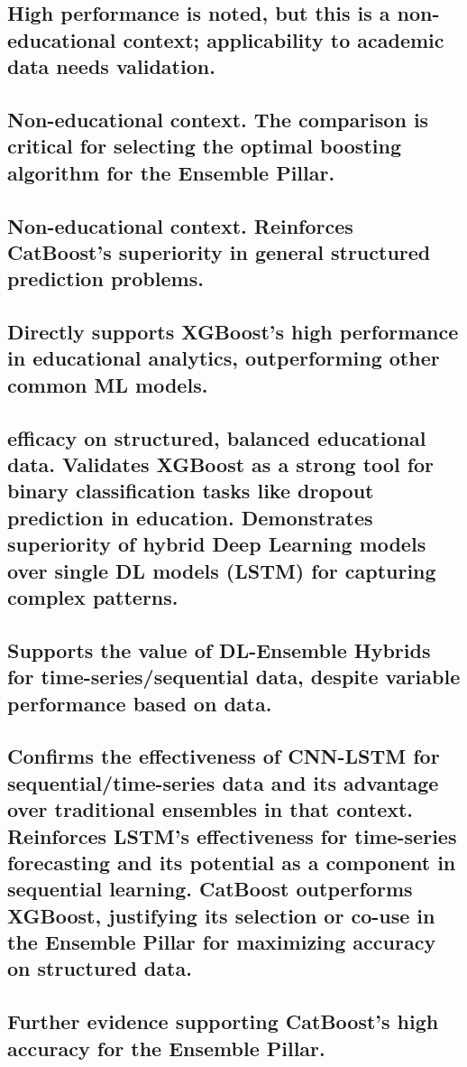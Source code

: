 \documentclass[twocolumn]{svjour3}
\begin{document}
\subsection{High performance is noted, but this is a non-educational context; applicability to academic data needs validation.}
\subsection{Non-educational context. The comparison is critical for selecting the optimal boosting algorithm for the Ensemble Pillar.}
\subsection{Non-educational context. Reinforces CatBoost's superiority in general structured prediction problems.}
\subsection{Directly supports XGBoost's high performance in educational analytics, outperforming other common ML models.}
\subsection{efficacy on structured, balanced educational data. Validates XGBoost as a strong tool for binary classification tasks like dropout prediction in education. Demonstrates superiority of hybrid Deep Learning models over single DL models (LSTM) for capturing complex patterns.}
\subsection{Supports the value of DL-Ensemble Hybrids for time-series/sequential data, despite variable performance based on data.}
\subsection{Confirms the effectiveness of CNN-LSTM for sequential/time-series data and its advantage over traditional ensembles in that context. Reinforces LSTM's effectiveness for time-series forecasting and its potential as a component in sequential learning. CatBoost outperforms XGBoost, justifying its selection or co-use in the Ensemble Pillar for maximizing accuracy on structured data.}
\subsection{Further evidence supporting CatBoost's high accuracy for the Ensemble Pillar.}
\end{document}
